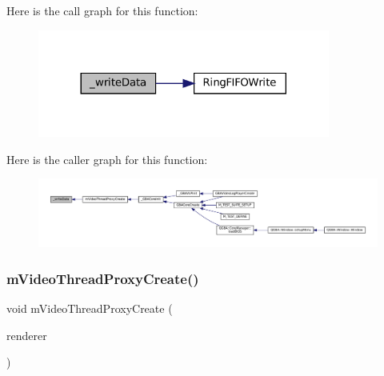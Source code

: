 Here is the call graph for this function\+:
\nopagebreak
\begin{figure}[H]
\begin{center}
\leavevmode
\includegraphics[width=272pt]{thread-proxy_8c_a163afd173e5992530065bb8ddc2b693e_cgraph}
\end{center}
\end{figure}
Here is the caller graph for this function\+:
\nopagebreak
\begin{figure}[H]
\begin{center}
\leavevmode
\includegraphics[width=350pt]{thread-proxy_8c_a163afd173e5992530065bb8ddc2b693e_icgraph}
\end{center}
\end{figure}
\mbox{\label{thread-proxy_8c_a8c023e44feda4222c0441d7bb694f546}} 
\subsubsection{\texorpdfstring{m\+Video\+Thread\+Proxy\+Create()}{mVideoThreadProxyCreate()}}
{\footnotesize\ttfamily void m\+Video\+Thread\+Proxy\+Create (\begin{DoxyParamCaption}\item[{struct m\+Video\+Thread\+Proxy $\ast$}]{renderer }\end{DoxyParamCaption})}

